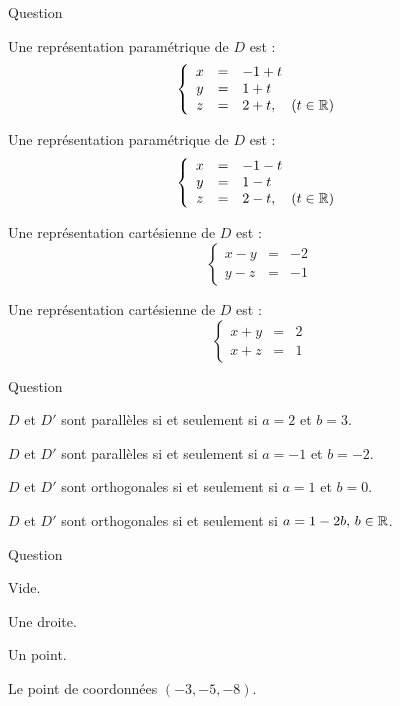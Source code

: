 \begin{multi}[multiple,feedback=
{\(D\) est dirigée par le vecteur \(\vec{u}(1,1,1)\).
}]{Question}
    \item* Une représentation paramétrique de \(D\) est :
\[\left\{\begin{array}{ccl}x&=&-1+t\\y&=&1+t\\ z&=&2+t,\quad (t\in \mathbb{R}) \end{array}\right.\]
    \item* Une représentation paramétrique de \(D\) est :
\[\left\{\begin{array}{ccl}x&=&-1-t\\y&=&1-t\\ z&=&2-t,\quad (t\in \mathbb{R}) \end{array}\right.\]
    \item* Une représentation cartésienne de \(D\) est :
\[\left\{\begin{array}{ccl}x-y&=&-2\\y-z&=&-1 \end{array}\right.\]
    \item Une représentation cartésienne de \(D\) est :
\[\left\{\begin{array}{ccl}x+y&=&2\\x+z&=&1 \end{array}\right.\]
\end{multi}


\begin{multi}[multiple,feedback=
{Si \(D\) est dirigée par un vecteur \(\vec{u}\) et \(D'\) est dirigée par un vecteur \(\vec{v}\), \(D\) et \(D'\) sont parallèles si et seulement si \(\vec{u} \wedge \vec{v} = \overrightarrow 0\). \(D\) et \(D'\) sont othogonales si et seulement si \(\vec{u} \cdot  \vec{v}=0\).
}]{Question}
    \item \(D\) et \(D'\) sont parallèles si et seulement si \(a=2\) et \(b=3\).
    \item* \(D\) et \(D'\) sont parallèles si et seulement si \(a=-1\) et \(b=-2\).
    \item \(D\) et \(D'\) sont orthogonales  si et seulement si \(a=1\) et \(b=0\).
    \item* \(D\) et \(D'\) sont orthogonales  si et seulement si \(a=1-2b, \, b \in \mathbb{R}\).
\end{multi}


\begin{multi}[multiple,feedback=
{On résout le système constitué des équations des trois plans.
}]{Question}
    \item Vide.
    \item Une droite.
    \item* Un point.
    \item* Le point de coordonnées \((-3,-5,-8)\).
\end{multi}


